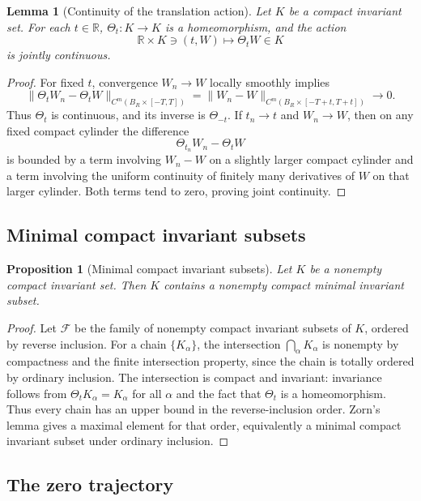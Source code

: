 \documentclass[11pt]{amsart}
\theoremstyle{plain}
\newtheorem{lemma}[lemma]{Lemma}
\newtheorem{proposition}[proposition]{Proposition}
\theoremstyle{definition}
\theoremstyle{remark}
\numberwithin{equation}{section}
\newcommand{\R}{\mathbb R}
\begin{document}
\begin{lemma}[Continuity of the translation action]\label{p2:lem:action-continuity}
Let \(K\) be a compact invariant set.  For each \(t\in\R\),
\(\Theta_t:K\to K\) is a homeomorphism, and the action
\[
   \R\times K\ni(t,W)\mapsto \Theta_tW\in K
\]
is jointly continuous.
\end{lemma}

\begin{proof}
For fixed \(t\), convergence \(W_n\to W\) locally smoothly implies
\[
   \|\Theta_tW_n-\Theta_tW\|_{C^m(B_R\times[-T,T])}
   =
   \|W_n-W\|_{C^m(B_R\times[-T+t,T+t])}\to0.
\]
Thus \(\Theta_t\) is continuous, and its inverse is \(\Theta_{-t}\).  If
\(t_n\to t\) and \(W_n\to W\), then on any fixed compact cylinder the
difference
\[
   \Theta_{t_n}W_n-\Theta_tW
\]
is bounded by a term involving \(W_n-W\) on a slightly larger compact cylinder
and a term involving the uniform continuity of finitely many derivatives of
\(W\) on that larger cylinder.  Both terms tend to zero, proving joint
continuity.
\end{proof}

\subsection{Minimal compact invariant subsets}

\begin{proposition}[Minimal compact invariant subsets]\label{p2:prop:minimal-subset}
Let \(K\) be a nonempty compact invariant set.  Then \(K\) contains a
nonempty compact minimal invariant subset.
\end{proposition}

\begin{proof}
Let \(\mathcal F\) be the family of nonempty compact invariant subsets of
\(K\), ordered by reverse inclusion.  For a chain \(\{K_\alpha\}\), the
intersection \(\bigcap_\alpha K_\alpha\) is nonempty by compactness and the
finite intersection property, since the chain is totally ordered by ordinary
inclusion.  The intersection is compact and invariant: invariance follows
from \(\Theta_tK_\alpha=K_\alpha\) for all \(\alpha\) and the fact that
\(\Theta_t\) is a homeomorphism.  Thus every chain has an upper bound in the
reverse-inclusion order.  Zorn's lemma gives a maximal element for that order,
equivalently a minimal compact invariant subset under ordinary inclusion.
\end{proof}

\subsection{The zero trajectory}
\end{document}
